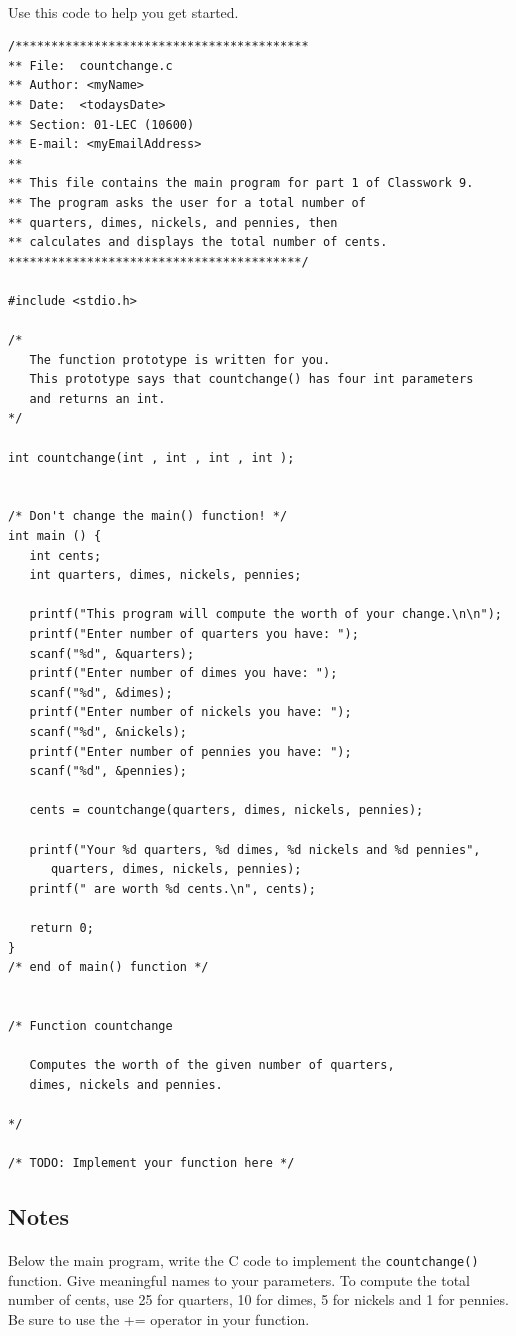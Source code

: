 \documentclass[letter,11pt]{article}
\begin{document}
\paragraph{}Use this code to help you get started.
\begin{verbatim}
/*****************************************
** File:  countchange.c
** Author: <myName>
** Date:  <todaysDate>
** Section: 01-LEC (10600)
** E-mail: <myEmailAddress>
**
** This file contains the main program for part 1 of Classwork 9.
** The program asks the user for a total number of 
** quarters, dimes, nickels, and pennies, then
** calculates and displays the total number of cents.
*****************************************/

#include <stdio.h>

/*
   The function prototype is written for you.
   This prototype says that countchange() has four int parameters
   and returns an int.
*/

int countchange(int , int , int , int );


/* Don't change the main() function! */
int main () {
   int cents;
   int quarters, dimes, nickels, pennies;

   printf("This program will compute the worth of your change.\n\n");
   printf("Enter number of quarters you have: ");
   scanf("%d", &quarters);
   printf("Enter number of dimes you have: ");
   scanf("%d", &dimes);
   printf("Enter number of nickels you have: ");
   scanf("%d", &nickels);
   printf("Enter number of pennies you have: ");
   scanf("%d", &pennies);

   cents = countchange(quarters, dimes, nickels, pennies);

   printf("Your %d quarters, %d dimes, %d nickels and %d pennies", 
      quarters, dimes, nickels, pennies);
   printf(" are worth %d cents.\n", cents);

   return 0;
}
/* end of main() function */


/* Function countchange
   
   Computes the worth of the given number of quarters,
   dimes, nickels and pennies.

*/

/* TODO: Implement your function here */
\end{verbatim}

\subsection*{Notes}
\paragraph{}Below the main program, write the C code to implement the \texttt{countchange()} function. Give meaningful names to your parameters. To compute the total number of cents, use 25 for quarters, 10 for dimes, 5 for nickels and 1 for pennies. Be sure to use the += operator in your function.
\end{document}
